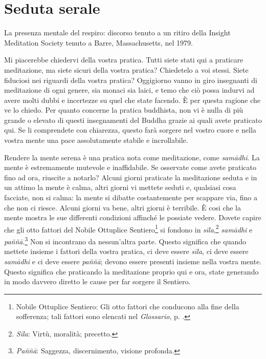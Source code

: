 \chapter{Seduta serale}

\begin{openingQuote}
  La presenza mentale del respiro: discorso tenuto a un ritiro della Insight
  Meditation Society tenuto a Barre, Massachusetts, nel 1979.
\end{openingQuote}

Mi piacerebbe chiedervi della vostra pratica. Tutti siete stati qui a
praticare meditazione, ma siete sicuri della vostra pratica? Chiedetelo
a voi stessi. Siete fiduciosi nei riguardi della vostra pratica?
Oggigiorno vanno in giro insegnanti di meditazione di ogni genere, sia
monaci sia laici, e temo che ciò possa indurvi ad avere molti dubbi e
incertezze su quel che state facendo. È per questa ragione che ve lo
chiedo. Per quanto concerne la pratica buddhista, non vi è nulla di più
grande o elevato di questi insegnamenti del Buddha grazie ai quali avete
praticato qui. Se li comprendete con chiarezza, questo farà sorgere nel
vostro cuore e nella vostra mente una pace assolutamente stabile e
incrollabile.

Rendere la mente serena è una pratica nota come meditazione, come
\emph{samādhi}. La mente è estremamente mutevole e inaffidabile. Se
osservate come avete praticato fino ad ora, riuscite a notarlo? Alcuni
giorni praticate la meditazione seduta e in un attimo la mente è calma,
altri giorni vi mettete seduti e, qualsiasi cosa facciate, non si calma:
la mente si dibatte costantemente per scappare via, fino a che non ci
riesce. Alcuni giorni va bene, altri giorni è terribile. È cosi che la
mente mostra le sue differenti condizioni affinché le possiate vedere.
Dovete capire che gli otto fattori del Nobile Ottuplice
Sentiero\footnote{Nobile Ottuplice Sentiero: Gli otto fattori che
  conducono alla fine della sofferenza; tali fattori sono elencati nel
  \emph{Glossario}, p. \pageref{glossary-ottuplice}.} si fondono in \emph{sīla},\footnote{\emph{Sīla}:
  Virtù, moralità; precetto.} \emph{samādhi} e \emph{paññā}.\footnote{\emph{Paññā}:
  Saggezza, discernimento, visione profonda.} Non si incontrano da
nessun'altra parte. Questo significa che quando mettete insieme i
fattori della vostra pratica, ci deve essere \emph{sīla}, ci deve essere
\emph{samādhi} e ci deve essere \emph{paññā}; devono essere presenti
insieme nella vostra mente. Questo significa che praticando la
meditazione proprio qui e ora, state generando in modo davvero diretto
le cause per far sorgere il Sentiero.

